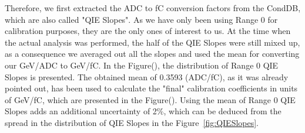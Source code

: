 Therefore, we first extracted the ADC to fC conversion factors from the CondDB,
which are also called "QIE Slopes". As we have only been using Range 0 for
calibration purposes, they are the only ones of interest to us. At the time when
the actual analysis was performed, the half of the QIE Slopes were still mixed
up, as a consequence we averaged out all the slopes and used the mean for
converting our GeV/ADC to GeV/fC. In the Figure(), the
distribution of Range 0 QIE Slopes is presented. The obtained mean of 0.3593
(ADC/fC), as it was already pointed out, has been used to calculate the "final"
calibration coefficients in units of GeV/fC, which are presented in the
Figure().
Using the mean of Range 0 QIE Slopes adds an additional
uncertainty of 2\%, which can be deduced from the spread in the distribution of
QIE Slopes in the Figure~\ref{fig:QIESlopes}.

